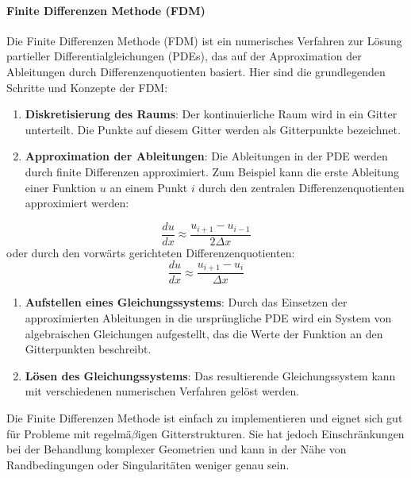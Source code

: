 
\paragraph{Finite Differenzen Methode (FDM)}

Die Finite Differenzen Methode (FDM) ist ein numerisches Verfahren zur Lösung partieller Differentialgleichungen (PDEs), das auf der Approximation der Ableitungen durch Differenzenquotienten basiert. Hier sind die grundlegenden Schritte und Konzepte der FDM:

\begin{enumerate}
\item \textbf{Diskretisierung des Raums}: Der kontinuierliche Raum wird in ein Gitter unterteilt. Die Punkte auf diesem Gitter werden als Gitterpunkte bezeichnet.
\item \textbf{Approximation der Ableitungen}: Die Ableitungen in der PDE werden durch finite Differenzen approximiert. Zum Beispiel kann die erste Ableitung einer Funktion $u$ an einem Punkt $i$ durch den zentralen Differenzenquotienten approximiert werden:
\end{enumerate}
\begin{equation}
\frac{du}{dx} \approx \frac{u_{i+1} - u_{i-1}}{2\Delta x}
\end{equation}
oder durch den vorwärts gerichteten Differenzenquotienten:
\begin{equation}
\frac{du}{dx} \approx \frac{u_{i+1} - u_i}{\Delta x}
\end{equation}
\begin{enumerate}[resume]
\item \textbf{Aufstellen eines Gleichungssystems}: Durch das Einsetzen der approximierten Ableitungen in die ursprüngliche PDE wird ein System von algebraischen Gleichungen aufgestellt, das die Werte der Funktion an den Gitterpunkten beschreibt.
\item \textbf{Lösen des Gleichungssystems}: Das resultierende Gleichungssystem kann mit verschiedenen numerischen Verfahren gelöst werden.
\end{enumerate}

Die Finite Differenzen Methode ist einfach zu implementieren und eignet sich gut für Probleme mit regelmä$\beta$igen Gitterstrukturen. Sie hat jedoch Einschränkungen bei der Behandlung komplexer Geometrien und kann in der Nähe von Randbedingungen oder Singularitäten weniger genau sein.


